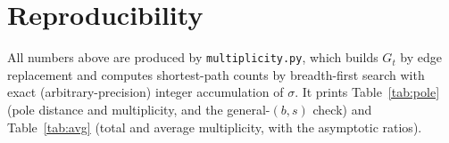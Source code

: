 \documentclass[aps,pre,onecolumn,superscriptaddress,floatfix]{revtex4-2}
\begin{document}
\section{Reproducibility}
\label{sec:repro}

All numbers above are produced by \texttt{multiplicity.py}, which builds $G_t$
by edge replacement and computes shortest-path counts by breadth-first search
with exact (arbitrary-precision) integer accumulation of $\sigma$. It prints
Table~\ref{tab:pole} (pole distance and multiplicity, and the general-$(b,s)$
check) and Table~\ref{tab:avg} (total and average multiplicity, with the
asymptotic ratios).
\end{document}
